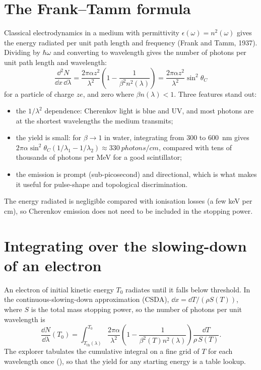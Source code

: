 \section{The Frank--Tamm formula}
Classical electrodynamics in a medium with permittivity $\epsilon(\omega) = n^2(\omega)$ gives the energy radiated per unit path length and frequency (Frank and Tamm, 1937). Dividing by $\hbar\omega$ and converting to wavelength gives the number of photons per unit path length and wavelength:
\begin{equation}
\boxed{\;\frac{\dd^2 N}{\dd x\,\dd\lambda} = \frac{2\pi\alpha z^2}{\lambda^2}\left(1 - \frac{1}{\beta^2 n^2(\lambda)}\right) = \frac{2\pi\alpha z^2}{\lambda^2}\sin^2\theta_C\;}
\label{eq:ft}
\end{equation}
for a particle of charge $ze$, and zero where $\beta n(\lambda) < 1$. Three features stand out:
\begin{itemize}
\item the $1/\lambda^2$ dependence: Cherenkov light is blue and UV, and most photons are at the shortest wavelengths the medium transmits;
\item the yield is small: for $\beta\to1$ in water, integrating from 300 to \SI{600}{nm} gives $2\pi\alpha\sin^2\theta_C(1/\lambda_1 - 1/\lambda_2) \approx \SI{330}{photons/cm}$, compared with tens of thousands of photons per MeV for a good scintillator;
\item the emission is prompt (sub-picosecond) and directional, which is what makes it useful for pulse-shape and topological discrimination.
\end{itemize}
The energy radiated is negligible compared with ionisation losses (a few keV per cm), so Cherenkov emission does not need to be included in the stopping power.

\section{Integrating over the slowing-down of an electron}
An electron of initial kinetic energy $T_0$ radiates until it falls below threshold. In the continuous-slowing-down approximation (CSDA), $\dd x = \dd T / (\rho S(T))$, where $S$ is the total mass stopping power, so the number of photons per unit wavelength is
\begin{equation}
\frac{\dd N}{\dd\lambda}(T_0) = \int_{T_\text{th}(\lambda)}^{T_0} \frac{2\pi\alpha}{\lambda^2}\left(1 - \frac{1}{\beta^2(T) n^2(\lambda)}\right)\frac{\dd T}{\rho\,S(T)} .
\label{eq:track}
\end{equation}
The explorer tabulates the cumulative integral on a fine grid of $T$ for each wavelength once (), so that the yield for any starting energy is a table lookup.

